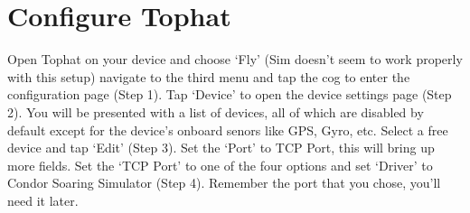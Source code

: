 \documentclass{article}
\begin{document}
    \section{Configure Tophat}
    Open Tophat on your device and choose `Fly' (Sim doesn't seem to work properly with this setup) navigate to the third
    menu and tap the cog to enter the configuration page (Step 1). Tap `Device' to open the device settings page (Step 2). 
    You will be presented with a list of devices, all of which are disabled by default except for the device's onboard
    senors like GPS, Gyro, etc. Select a free device and tap `Edit' (Step 3). Set the `Port' to TCP Port, this will bring
    up more fields. Set the `TCP Port' to one of the four options and set `Driver' to Condor Soaring Simulator (Step 4).
    Remember the port that you chose, you'll need it later.
    \begin{figure}[h!]
        \centering
        \captionsetup[subfigure]{labelformat=empty}
        \begin{subfigure}[b]{0.24\linewidth}

\end{subfigure}
\end{figure}
\end{document}
